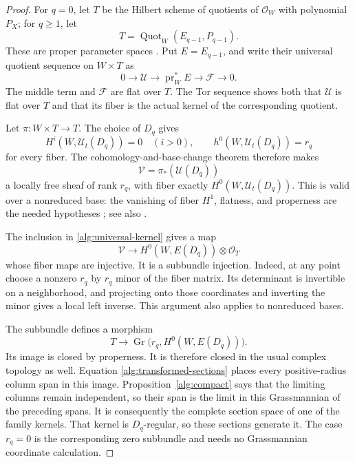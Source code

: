 \documentclass[11pt,reqno]{amsart}
\numberwithin{equation}{section}
\theoremstyle{definition}
\theoremstyle{remark}
\begin{document}
\begin{proof}
For \(q=0\), let \(T\) be the Hilbert scheme of quotients of
\(\mathcal O_W\) with polynomial \(P_X\); for \(q\geq1\), let
\[
 T=\operatorname{Quot}_W(E_{q-1},P_{q-1}).
\]
These are proper parameter spaces
\cite{GrothendieckHilbert,StacksQuot}. Put \(E=E_{q-1}\), and write
their universal quotient sequence on \(W\times T\) as
\begin{equation}
 0\longrightarrow\mathscr U
 \longrightarrow\operatorname{pr}_W^*E
 \longrightarrow\mathscr F
 \longrightarrow0.
 \label{alg:universal-kernel}
\end{equation}
The middle term and \(\mathscr F\) are flat over \(T\). The Tor
sequence shows both that \(\mathscr U\) is flat over \(T\) and that
its fiber is the actual kernel of the corresponding quotient.

Let \(\pi:W\times T\to T\). The choice of \(D_q\) gives
\[
 H^i(W,\mathscr U_t(D_q))=0\quad(i>0),\qquad
 h^0(W,\mathscr U_t(D_q))=r_q
\]
for every fiber. The cohomology-and-base-change theorem therefore makes
\[
 \mathscr V=\pi_*(\mathscr U(D_q))
\]
a locally free sheaf of rank \(r_q\), with fiber exactly
\(H^0(W,\mathscr U_t(D_q))\). This is valid over a nonreduced base:
the vanishing of fiber \(H^1\), flatness, and properness are the needed
hypotheses \cite[Theorem~1.1 and Corollary~1.2]{ConradBaseChange};
see also \cite[III, Theorem~12.11]{Hartshorne}.

The inclusion in \eqref{alg:universal-kernel} gives a map
\[
 \mathscr V\longrightarrow
 H^0(W,E(D_q))\otimes\mathcal O_T
\]
whose fiber maps are injective. It is a subbundle injection. Indeed,
at any point choose a nonzero \(r_q\) by \(r_q\) minor of the fiber
matrix. Its determinant is invertible on a neighborhood, and projecting
onto those coordinates and inverting the minor gives a local left
inverse. This argument also applies to nonreduced bases.

The subbundle defines a morphism
\[
 T\longrightarrow
 \operatorname{Gr}\bigl(r_q,H^0(W,E(D_q))\bigr).
\]
Its image is closed by properness. It is therefore closed in the usual
complex topology as well. Equation \eqref{alg:transformed-sections}
places every positive-radius column span in this image.
Proposition~\ref{alg:compact} says that the limiting columns remain
independent, so their span is the limit in this Grassmannian of the
preceding spans. It is consequently the complete section space of
one of the family kernels. That kernel is \(D_q\)-regular, so these
sections generate it. The case \(r_q=0\) is the corresponding zero
subbundle and needs no Grassmannian coordinate calculation.
\end{proof}
\end{document}

